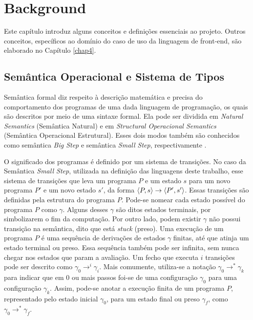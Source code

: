 \chapter{Background}
\label{chap2}

Este capítulo introduz alguns conceitos e definições essenciais ao projeto. 
Outros conceitos, específicos ao domínio do caso de uso da linguagem de front-end,
são elaborado no Capítulo \ref{chap4}. 

\section{Semântica Operacional e Sistema de Tipos}

Semântica formal diz respeito à descrição matemática e precisa do comportamento dos programas de uma dada linguagem de programação, os quais são descritos por meio de uma sintaxe formal. Ela pode ser dividida em \emph{Natural Semantics} (Semântica Natural) e em \emph{Structural Operacional Semantics} (Semântica Operacional Estrutural). Esses dois modos também são conhecidos como semântica \emph{Big Step} e semântica \emph{Small Step}, respectivamente \cite{NIELSON}.

O significado dos programas é definido por um sistema de transições. No caso da Semântica \emph{Small Step}, utilizada na definição das linguagens deste trabalho, esse sistema de transições que leva um programa $P$ e um estado $s$ para um novo programa $P'$ e um novo estado $s'$, da forma $\langle P, s \rangle \to \langle P', s' \rangle$. Essas transições são definidas pela estrutura do programa $P$. Pode-se nomear cada estado possível do programa $P$ como $\gamma$. Alguns desses $\gamma$ são ditos estados terminais, por simbolizarem o fim da computação. Por outro lado, podem existir $\gamma$ não possui transição na semântica, dito que está \emph{stuck} (preso). Uma execução de um programa $P$ é uma sequência de derivações de estados $\gamma$ finitas, até que atinja um estado terminal ou preso. Essa sequência também pode ser infinita, sem nunca chegar nos estados que param a avaliação. Um fecho que executa $i$ transições pode ser descrito como $\gamma_0 \to^i \gamma_i$. Mais comumente, utiliza-se a notação $\gamma_0 \to^* \gamma_k$ para indicar que em 0 ou mais passos foi-se de uma configuração $\gamma_0$ para uma configuração $\gamma_k$. Assim, pode-se anotar a execução finita de um programa $P$, representado pelo estado inicial $\gamma_0$, para um estado final ou preso $\gamma_f$, como $\gamma_0 \to^* \gamma_f$.


